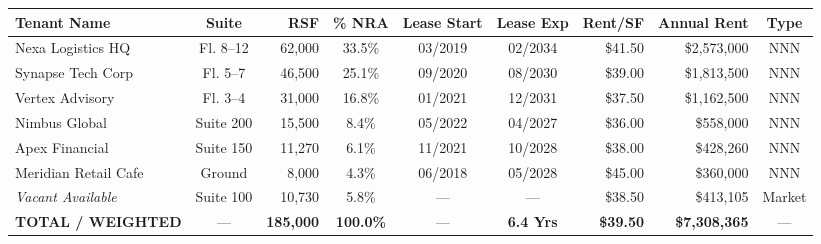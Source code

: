 \documentclass[10pt,a4paper]{scrartcl}
\begin{document}
\vspace{2pt}
\begin{center}
\scriptsize
{}
\begin{tabularx}{\textwidth}{@{} l c r c c c r r c @{}}
\toprule
\rowcolor{navyprimary}
{\color{white}\textbf{Tenant Name}} & {\color{white}\textbf{Suite}} & {\color{white}\textbf{RSF}} & {\color{white}\textbf{\% NRA}} & {\color{white}\textbf{Lease Start}} & {\color{white}\textbf{Lease Exp}} & {\color{white}\textbf{Rent/SF}} & {\color{white}\textbf{Annual Rent}} & {\color{white}\textbf{Type}} \\
\midrule
Nexa Logistics HQ & Fl. 8--12 & 62,000 & 33.5\% & 03/2019 & 02/2034 & \$41.50 & \$2,573,000 & NNN \\
Synapse Tech Corp & Fl. 5--7 & 46,500 & 25.1\% & 09/2020 & 08/2030 & \$39.00 & \$1,813,500 & NNN \\
Vertex Advisory & Fl. 3--4 & 31,000 & 16.8\% & 01/2021 & 12/2031 & \$37.50 & \$1,162,500 & NNN \\
Nimbus Global & Suite 200 & 15,500 & 8.4\% & 05/2022 & 04/2027 & \$36.00 & \$558,000 & NNN \\
Apex Financial & Suite 150 & 11,270 & 6.1\% & 11/2021 & 10/2028 & \$38.00 & \$428,260 & NNN \\
Meridian Retail Cafe & Ground & 8,000 & 4.3\% & 06/2018 & 05/2028 & \$45.00 & \$360,000 & NNN \\
\rowcolor{cardbg}
\textit{Vacant Available} & Suite 100 & 10,730 & 5.8\% & --- & --- & \$38.50 & \$413,105 & Market \\
\midrule
\rowcolor{navyprimary}
{\color{white}\textbf{TOTAL / WEIGHTED}} & {\color{white}---} & {\color{white}\textbf{185,000}} & {\color{white}\textbf{100.0\%}} & {\color{white}---} & {\color{white}\textbf{6.4 Yrs}} & {\color{white}\textbf{\$39.50}} & {\color{white}\textbf{\$7,308,365}} & {\color{white}---} \\
\bottomrule
\end{tabularx}
\end{center}

\vspace{1pt}

\end{document}
